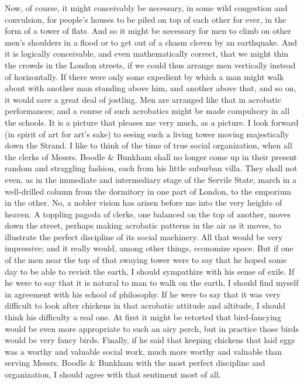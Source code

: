 \documentclass{book}
\begin{document}
Now, of course, it might conceivably be necessary, in some wild congestion and convulsion, for people’s houses to be piled on top of each other for ever, in the form of a tower of flats. And so it might be necessary for men to climb on other men’s shoulders in a flood or to get out of a chasm cloven by an earthquake. And it is logically conceivable, and even mathematically correct, that we might thin the crowds in the London streets, if we could thus arrange men vertically instead of horizontally. If there were only some expedient by which a man might walk about with another man standing above him, and another above that, and so on, it would save a great deal of jostling. Men are arranged like that in acrobatic performances; and a course of such acrobatics might be made compulsory in all the schools. It is a picture that pleases me very much, as a picture. I look forward (in spirit of art for art’s sake) to seeing such a living tower moving majestically down the Strand. I like to think of the time of true social organization, when all the clerks of Messrs. Boodle \& Bunkham shall no longer come up in their present random and straggling fashion, each from his little suburban villa. They shall not even, as in the immediate and intermediary stage of the Servile State, march in a well-drilled column from the dormitory in one part of London, to the emporium in the other. No, a nobler vision has arisen before me into the very heights of heaven. A toppling pagoda of clerks, one balanced on the top of another, moves down the street, perhaps making acrobatic patterns in the air as it moves, to illustrate the perfect discipline of its social machinery. All that would be very impressive; and it really would, among other things, economize space. But if one of the men near the top of that swaying tower were to say that he hoped some day to be able to revisit the earth, I should sympathize with his sense of exile. If he were to say that it is natural to man to walk on the earth, I should find myself in agreement with his school of philosophy. If he were to say that it was very difficult to look after chickens in that acrobatic attitude and altitude, I should think his difficulty a real one. At first it might be retorted that bird-fancying would be even more appropriate to such an airy perch, but in practice those birds would be very fancy birds. Finally, if he said that keeping chickens that laid eggs was a worthy and valuable social work, much more worthy and valuable than serving Messrs. Boodle \& Bunkham with the most perfect discipline and organization, I should agree with that sentiment most of all.
\end{document}
